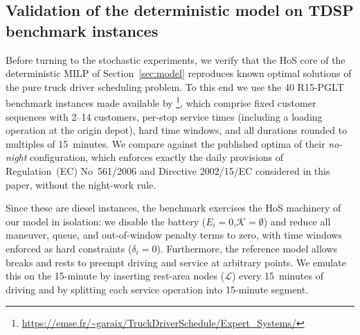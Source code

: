 \documentclass[preprint,12pt,3p]{elsarticle}
\begin{document}
\subsection{Validation of the deterministic model on TDSP benchmark instances}
\label{sec:validation}

Before turning to the stochastic experiments, we verify that the HoS core of the deterministic MILP of Section~\ref{sec:model} reproduces known optimal solutions of the pure truck driver scheduling problem. To this end we use the 40 R15-PGLT benchmark instances made available by \citet{garaix_label-setting_2024}\footnote{\url{https://emse.fr/~garaix/TruckDriverSchedule/Expert_Systems/}}, which comprise fixed customer sequences with 2--14 customers, per-stop service times (including a loading operation at the origin depot), hard time windows, and all durations rounded to multiples of 15~minutes. We compare against the published optima of their \emph{no-night} configuration, which enforces exactly the daily provisions of Regulation~(EC) No~561/2006 and Directive 2002/15/EC considered in this paper, without the night-work rule.

Since these are diesel instances, the benchmark exercises the HoS machinery of our model in isolation: we disable the battery ($E_i = 0$,$\mathcal K = \emptyset$) and reduce all maneuver, queue, and out-of-window penalty terms to zero, with time windows enforced as hard constraints ($\delta_i = 0$). Furthermore, the reference model allows breaks and rests to preempt driving and service at arbitrary points. We emulate this on the 15-minute by inserting rest-area nodes ($\mathcal L$) every 15~minutes of driving and by splitting each service operation into 15-minute segment.

\end{document}
